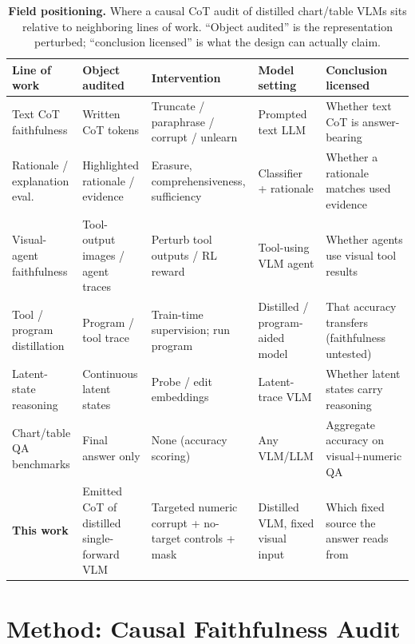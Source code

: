 \documentclass[11pt]{article}
\begin{document}
\begin{table}[t]
\centering
\scriptsize
\setlength{\tabcolsep}{3pt}
\caption{\textbf{Field positioning.} Where a causal CoT audit of distilled chart/table VLMs sits relative to neighboring lines of work. ``Object audited'' is the representation perturbed; ``conclusion licensed'' is what the design can actually claim.}
\label{tab:positioning}
\begin{tabular}{@{}L{0.17\textwidth}L{0.17\textwidth}L{0.16\textwidth}L{0.16\textwidth}L{0.20\textwidth}@{}}
\toprule
Line of work & Object audited & Intervention & Model setting & Conclusion licensed \\
\midrule
Text CoT faithfulness \citep{lanham2023,turpin2023,tutek2025,bentham2024,pfau2024} & Written CoT tokens & Truncate / paraphrase / corrupt / unlearn & Prompted text LLM & Whether text CoT is answer-bearing \\
Rationale / explanation eval. \citep{jacovi2020faithfulness,wiegreffe2021teach,deyoung2020eraser} & Highlighted rationale / evidence & Erasure, comprehensiveness, sufficiency & Classifier + rationale & Whether a rationale matches used evidence \\
Visual-agent faithfulness \citep{visualthinking2025,codev} & Tool-output images / agent traces & Perturb tool outputs / RL reward & Tool-using VLM agent & Whether agents use visual tool results \\
Tool / program distillation \citep{vpd,gao2023pal,chen2023pot,schick2023toolformer,hsieh2023distilling} & Program / tool trace & Train-time supervision; run program & Distilled / program-aided model & That accuracy transfers (faithfulness untested) \\
Latent-state reasoning \citep{pearl,capimagine2026} & Continuous latent states & Probe / edit embeddings & Latent-trace VLM & Whether latent states carry reasoning \\
Chart/table QA benchmarks \citep{chartqa,tabmwp,kafle2018dvqa,methani2020plotqa,chen2021finqa} & Final answer only & None (accuracy scoring) & Any VLM/LLM & Aggregate accuracy on visual+numeric QA \\
\textbf{This work} & Emitted CoT of distilled single-forward VLM & Targeted numeric corrupt + no-target controls + mask & Distilled VLM, fixed visual input & Which fixed source the answer reads from \\
\bottomrule
\end{tabular}
\end{table}

\section{Method: Causal Faithfulness Audit}
\label{sec:setup}
\end{document}
